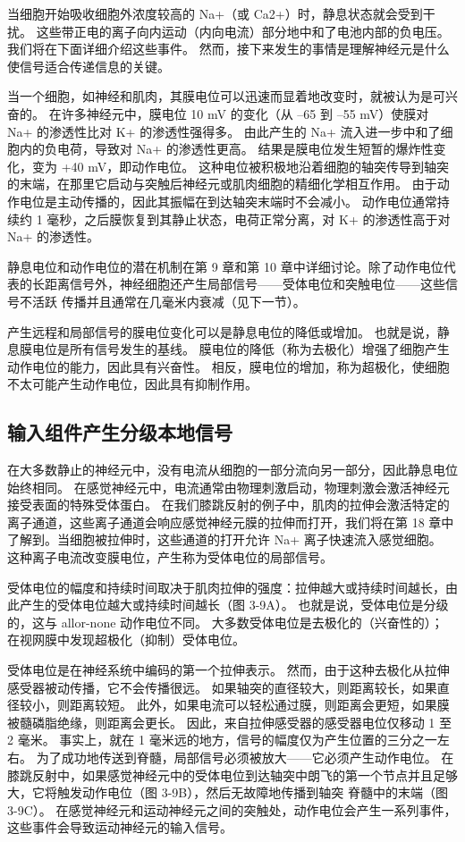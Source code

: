 当细胞开始吸收细胞外浓度较高的 Na+（或 Ca2+）时，静息状态就会受到干扰。 这些带正电的离子向内运动（内向电流）部分地中和了电池内部的负电压。 我们将在下面详细介绍这些事件。 然而，接下来发生的事情是理解神经元是什么使信号适合传递信息的关键。

当一个细胞，如神经和肌肉，其膜电位可以迅速而显着地改变时，就被认为是可兴奋的。 在许多神经元中，膜电位 10 mV 的变化（从 –65 到 –55 mV）使膜对 Na+ 的渗透性比对 K+ 的渗透性强得多。 由此产生的 Na+ 流入进一步中和了细胞内的负电荷，导致对 Na+ 的渗透性更高。 结果是膜电位发生短暂的爆炸性变化，变为 +40 mV，即动作电位。 这种电位被积极地沿着细胞的轴突传导到轴突的末端，在那里它启动与突触后神经元或肌肉细胞的精细化学相互作用。 由于动作电位是主动传播的，因此其振幅在到达轴突末端时不会减小。 动作电位通常持续约 1 毫秒，之后膜恢复到其静止状态，电荷正常分离，对 K+ 的渗透性高于对 Na+ 的渗透性。

静息电位和动作电位的潜在机制在第 9 章和第 10 章中详细讨论。除了动作电位代表的长距离信号外，神经细胞还产生局部信号——受体电位和突触电位——这些信号不活跃 传播并且通常在几毫米内衰减（见下一节）。

产生远程和局部信号的膜电位变化可以是静息电位的降低或增加。 也就是说，静息膜电位是所有信号发生的基线。 膜电位的降低（称为去极化）增强了细胞产生动作电位的能力，因此具有兴奋性。 相反，膜电位的增加，称为超极化，使细胞不太可能产生动作电位，因此具有抑制作用。


\subsection{输入组件产生分级本地信号}
在大多数静止的神经元中，没有电流从细胞的一部分流向另一部分，因此静息电位始终相同。 在感觉神经元中，电流通常由物理刺激启动，物理刺激会激活神经元接受表面的特殊受体蛋白。 在我们膝跳反射的例子中，肌肉的拉伸会激活特定的离子通道，这些离子通道会响应感觉神经元膜的拉伸而打开，我们将在第 18 章中了解到。当细胞被拉伸时，这些通道的打开允许 Na+ 离子快速流入感觉细胞。 这种离子电流改变膜电位，产生称为受体电位的局部信号。

受体电位的幅度和持续时间取决于肌肉拉伸的强度：拉伸越大或持续时间越长，由此产生的受体电位越大或持续时间越长（图 3-9A）。 也就是说，受体电位是分级的，这与 allor-none 动作电位不同。 大多数受体电位是去极化的（兴奋性的）； 在视网膜中发现超极化（抑制）受体电位。

受体电位是在神经系统中编码的第一个拉伸表示。 然而，由于这种去极化从拉伸感受器被动传播，它不会传播很远。 如果轴突的直径较大，则距离较长，如果直径较小，则距离较短。 此外，如果电流可以轻松通过膜，则距离会更短，如果膜被髓磷脂绝缘，则距离会更长。 因此，来自拉伸感受器的感受器电位仅移动 1 至 2 毫米。 事实上，就在 1 毫米远的地方，信号的幅度仅为产生位置的三分之一左右。 为了成功地传送到脊髓，局部信号必须被放大——它必须产生动作电位。 在膝跳反射中，如果感觉神经元中的受体电位到达轴突中朗飞的第一个节点并且足够大，它将触发动作电位（图 3-9B），然后无故障地传播到轴突 脊髓中的末端（图 3-9C）。 在感觉神经元和运动神经元之间的突触处，动作电位会产生一系列事件，这些事件会导致运动神经元的输入信号。

